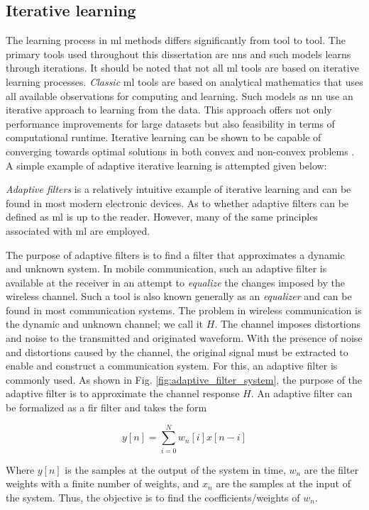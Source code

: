 \subsection{Iterative learning}
The learning process in \gls{ml} methods differs significantly from tool to tool. The primary tools used throughout this dissertation are \glspl{nn} and such models learns through iterations. It should be noted that not all \gls{ml} tools are based on iterative learning processes. \emph{Classic} \gls{ml} tools are based on analytical mathematics that uses all available observations for computing and learning. Such models as \gls{nn} use an iterative approach to learning from the data. This approach offers not only performance improvements for large datasets but also feasibility in terms of computational runtime. Iterative learning can be shown to be capable of converging towards optimal solutions in both convex and non-convex problems \cite{M.Bishop2006}. A simple example of adaptive iterative learning is attempted given below:

\emph{Adaptive filters} is a relatively intuitive example of iterative learning and can be found in most modern electronic devices. As to whether adaptive filters can be defined as \gls{ml} is up to the reader. However, many of the same principles associated with \gls{ml} are employed. 

The purpose of adaptive filters is to find a filter that approximates a dynamic and unknown system. In mobile communication, such an adaptive filter is available at the receiver in an attempt to \emph{equalize} the changes imposed by the wireless channel. Such a tool is also known generally as an \emph{equalizer} and can be found in most communication systems. The problem in wireless communication is the dynamic and unknown channel; we call it $H$. The channel imposes distortions and noise to the transmitted and originated waveform. With the presence of noise and distortions caused by the channel, the original signal must be extracted to enable and construct a communication system. For this, an adaptive filter is commonly used.  As shown in Fig. \ref{fig:adaptive_filter_system}, the purpose of the adaptive filter is to approximate the channel response $H$. An adaptive filter can be formalized as a \gls{fir} filter and takes the form 

\begin{equation}\label{eq:fir}
    y[n] = \sum_{i=0}^N w_n[i]x[n-i]
\end{equation}

Where $y[n]$ is the samples at the output of the system in time, $w_n$ are the filter weights with a finite number of weights, and $x_n$ are the samples at the input of the system. Thus, the objective is to find the coefficients/weights of $w_n$. 

